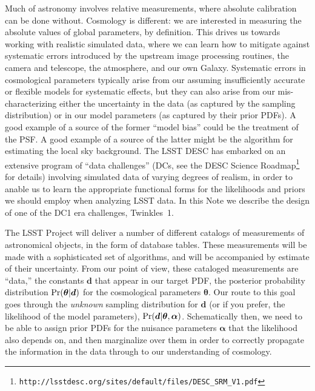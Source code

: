 \documentclass[\docopts]{\docclass}
\begin{document}
Much of astronomy involves relative measurements, where absolute calibration can be done without.
Cosmology is different: we are interested in measuring the absolute values of global parameters, by definition.
This drives us towards working with realistic simulated data, where we can learn how to mitigate against systematic errors introduced by the upstream image processing routines, the camera and telescope, the atmosphere, and our own Galaxy.
Systematic errors in cosmological parameters typically arise from our assuming insufficiently accurate or flexible models for systematic effects, but they can also arise from our mis-characterizing either the uncertainty in the data (as captured by the sampling distribution) or in our model parameters (as captured by their prior PDFs).
A good example of a source of the former ``model bias'' could be the treatment of the PSF.
A good example of a source of the latter might be the algorithm for estimating the local sky background.
The LSST DESC has embarked on an extensive program of ``data challenges'' (DCs, see the DESC Science Roadmap\footnote{\texttt{http://lsstdesc.org/sites/default/files/DESC\_SRM\_V1.pdf}} for details) involving simulated data of varying degrees of realism, in order to anable us to learn the appropriate functional forms for the likelihoods and priors we should employ when analyzing LSST data.
In this Note we describe the design of one of the DC1 era challenges, Twinkles~1.

The LSST Project will deliver a number of different catalogs of measurements of astronomical objects, in the form of database tables.
These measurements will be made with a sophisticated set of algorithms, and will be accompanied by estimate of their uncertainty.
From our point of view, these cataloged measurements are ``data,'' the constants $\boldsymbol{d}$ that appear in our target PDF, the posterior probability distribution ${\rm Pr}(\boldsymbol{\theta}|\boldsymbol{d})$ for the cosmological parameters $\boldsymbol{\theta}$.
Our route to this goal goes through the {\it unknown} sampling distribution for $\boldsymbol{d}$ (or if you prefer, the likelihood of the model parameters), ${\rm Pr}(\boldsymbol{d}|\boldsymbol{\theta},\boldsymbol{\alpha})$.
Schematically then, we need to be able to assign prior PDFs for the nuisance parameters $\boldsymbol{\alpha}$ that the likelihood also depends on, and then marginalize over them in order to correctly propagate the information in the data through to our understanding of cosmology.
\end{document}
